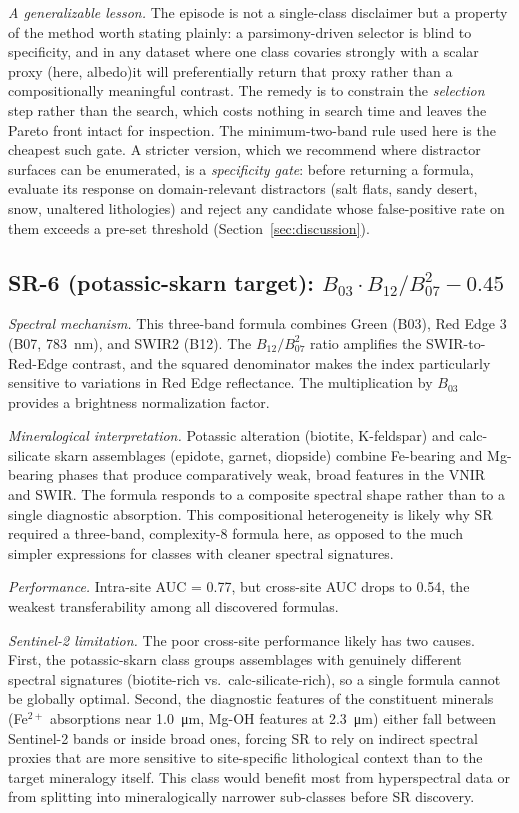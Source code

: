 \documentclass[preprint,authoryear,number]{elsarticle}
\begin{document}
\emph{A generalizable lesson.} The episode is not a single-class disclaimer but a property of the method worth stating plainly: a parsimony-driven selector is blind to specificity, and in any dataset where one class covaries strongly with a scalar proxy (here, albedo)it will preferentially return that proxy rather than a compositionally meaningful contrast. The remedy is to constrain the \emph{selection} step rather than the search, which costs nothing in search time and leaves the Pareto front intact for inspection. The minimum-two-band rule used here is the cheapest such gate. A stricter version, which we recommend where distractor surfaces can be enumerated, is a \emph{specificity gate}: before returning a formula, evaluate its response on domain-relevant distractors (salt flats, sandy desert, snow, unaltered lithologies) and reject any candidate whose false-positive rate on them exceeds a pre-set threshold (Section~\ref{sec:discussion}).

\subsection{SR-6 (potassic-skarn target): $B_{03} \cdot B_{12}/B_{07}^2 - 0.45$}

\emph{Spectral mechanism.} This three-band formula combines Green (B03), Red Edge 3 (B07, \SI{783}{\nano\meter}), and SWIR2 (B12). The $B_{12}/B_{07}^2$ ratio amplifies the SWIR-to-Red-Edge contrast, and the squared denominator makes the index particularly sensitive to variations in Red Edge reflectance. The multiplication by $B_{03}$ provides a brightness normalization factor.

\emph{Mineralogical interpretation.} Potassic alteration (biotite, K-feldspar) and calc-silicate skarn assemblages (epidote, garnet, diopside) combine Fe-bearing and Mg-bearing phases that produce comparatively weak, broad features in the VNIR and SWIR. The formula responds to a composite spectral shape rather than to a single diagnostic absorption. This compositional heterogeneity is likely why SR required a three-band, complexity-8 formula here, as opposed to the much simpler expressions for classes with cleaner spectral signatures.

\emph{Performance.} Intra-site AUC = 0.77, but cross-site AUC drops to 0.54, the weakest transferability among all discovered formulas.

\emph{Sentinel-2 limitation.} The poor cross-site performance likely has two causes. First, the potassic-skarn class groups assemblages with genuinely different spectral signatures (biotite-rich vs.\ calc-silicate-rich), so a single formula cannot be globally optimal. Second, the diagnostic features of the constituent minerals (Fe$^{2+}$ absorptions near \SI{1.0}{\micro\meter}, Mg-OH features at \SI{2.3}{\micro\meter}) either fall between Sentinel-2 bands or inside broad ones, forcing SR to rely on indirect spectral proxies that are more sensitive to site-specific lithological context than to the target mineralogy itself. This class would benefit most from hyperspectral data or from splitting into mineralogically narrower sub-classes before SR discovery.
\end{document}
